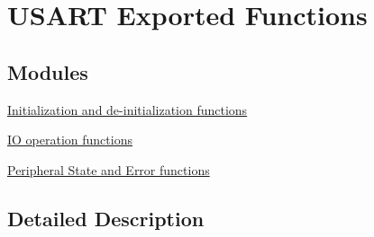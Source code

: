 \hypertarget{group___u_s_a_r_t___exported___functions}{}\section{U\+S\+A\+RT Exported Functions}
\label{group___u_s_a_r_t___exported___functions}
\subsection*{Modules}
\begin{DoxyCompactItemize}
\item 
\hyperlink{group___u_s_a_r_t___exported___functions___group1}{Initialization and de-\/initialization functions}
\item 
\hyperlink{group___u_s_a_r_t___exported___functions___group2}{I\+O operation functions}
\item 
\hyperlink{group___u_s_a_r_t___exported___functions___group3}{Peripheral State and Error functions}
\end{DoxyCompactItemize}


\subsection{Detailed Description}
